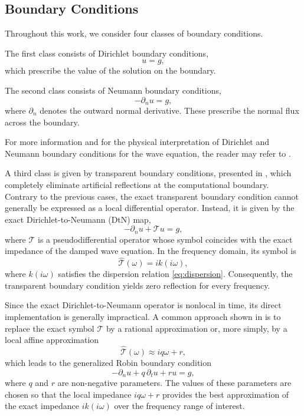 \documentclass{Configuration_Files/PoliMi3i_thesis}
\begin{document}
\subsection{Boundary Conditions}

Throughout this work, we consider four classes of boundary conditions.

The first class consists of Dirichlet boundary conditions,
\begin{equation*}
u=g,
\end{equation*}
which prescribe the value of the solution on the boundary.

The second class consists of Neumann boundary conditions,
\begin{equation*}
-\partial_nu=g,
\end{equation*}
where \(\partial_n\) denotes the outward normal derivative. These prescribe the normal flux across the boundary.

For more information and for the physical interpretation of Dirichlet and Neumann boundary conditions for the wave equation, the reader may refer to \cite{bilbao_numerical_2009}.

A third class is given by transparent boundary conditions, presented in \cite{engquist_absorbing_1977,gander_absorbing_2004}, which completely eliminate artificial reflections at the computational boundary. Contrary to the previous cases, the exact transparent boundary condition cannot generally be expressed as a local differential operator. Instead, it is given by the exact Dirichlet-to-Neumann (DtN) map,
\begin{equation*}
-\partial_nu+\mathcal{T}u=g,
\end{equation*}
where \(\mathcal{T}\) is a pseudodifferential operator whose symbol coincides with the exact impedance of the damped wave equation. In the frequency domain, its symbol is
\begin{equation*}
\widehat{\mathcal{T}}(\omega)
=
ik(i\omega),
\end{equation*}
where \(k(i\omega)\) satisfies the dispersion relation \eqref{eq:dispersion}. Consequently, the transparent boundary condition yields zero reflection for every frequency.

Since the exact Dirichlet-to-Neumann operator is nonlocal in time, its direct implementation is generally impractical. A common approach shown in \cite{gander_absorbing_2004} is to replace the exact symbol \(\mathcal{T}\) by a rational approximation or, more simply, by a local affine approximation
\begin{equation*}
\widehat{\mathcal{T}}(\omega)
\approx
iq\omega+r,
\end{equation*}
which leads to the generalized Robin boundary condition
\begin{equation*}
-\partial_nu
+
q\,\partial_tu
+
ru
=
g,
\end{equation*}
where \(q\) and \(r\) are non-negative parameters. The values of these parameters are chosen so that the local impedance \(iq\omega+r\) provides the best approximation of the exact impedance \(ik(i\omega)\) over the frequency range of interest.
\end{document}
